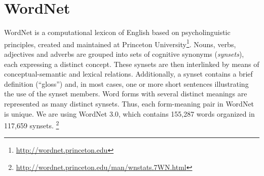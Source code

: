 \section{WordNet}
WordNet \citep{miller1995wordnet} \citep{fellbaum1998wordnet} is a computational lexicon of English based on psycholinguistic principles, created and maintained at Princeton University\footnote{\url{http://wordnet.princeton.edu}}. Nouns, verbs, adjectives and adverbs are grouped into sets of cognitive synonyms (\textit{synsets}), each expressing a distinct concept. These synsets are then interlinked by means of conceptual-semantic and lexical relations. Additionally, a synset contains a brief definition (“gloss”) and, in most cases, one or more short sentences illustrating the use of the synset members. Word forms with several distinct meanings are represented as many distinct synsets. Thus, each form-meaning pair in WordNet is unique. We are using WordNet 3.0, which contains 155,287 words organized in 117,659 synsets. \footnote{\url{http://wordnet.princeton.edu/man/wnstats.7WN.html}} 

